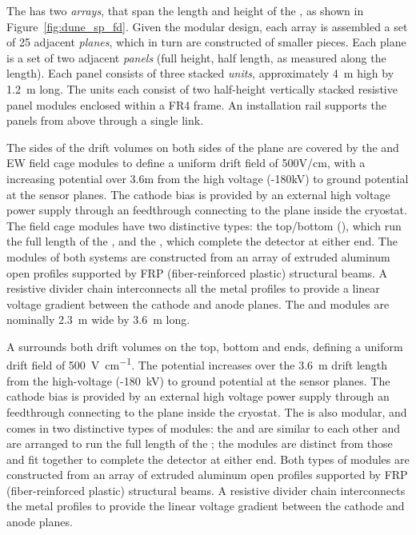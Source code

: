 The  has two  \textit{arrays}, that span the length and height of the , as shown in Figure~\ref{fig:dune_sp_fd}. Given the modular design, each array is assembled a set of 25 adjacent  \textit{planes}, which in turn are constructed of smaller pieces.  Each plane is a set of two adjacent \textit{panels} (full height, half length, as measured along the  length). Each panel consists of three stacked \textit{units}, approximately \SI{4}{\meter} high by \SI{1.2}{\meter} long. The units each consist of two half-height vertically stacked resistive panel modules enclosed within a FR4 frame.
An  installation rail supports the panels from above through a single link.


The sides of the drift volumes on both sides of the  plane are covered by the  and EW field cage modules to define a uniform drift field of 500V/cm, with a increasing potential over 3.6m from the high voltage  (-180kV) to ground potential at the  sensor planes. The cathode bias is provided by an external high voltage power supply through an  feedthrough connecting to the  plane inside the cryostat.
The field cage modules have two distinctive types: the top/bottom (), which run the full length of the , and the , %
which complete the detector at either end. The modules of both systems are constructed from an array of extruded aluminum open profiles supported by FRP (fiber-reinforced plastic) structural beams. A resistive divider chain interconnects all the metal profiles to provide a linear voltage gradient between the cathode and anode planes.  The  and  modules are nominally  \SI{2.3}{\meter} wide by  \SI{3.6}{\meter} long. 

A  surrounds both drift volumes on the top, bottom and ends, defining 
a uniform drift field of \SI{500}{\volt\per\centi\meter}. The potential increases over the \SI{3.6}{\meter} drift length from the high-voltage  (-\SI{180}{\kilo\volt}) to ground potential at the  sensor planes. The cathode bias is provided by an external high voltage power supply through an  feedthrough connecting to the  plane inside the cryostat. 
The  is also modular, and comes in two distinctive types of modules: the  and  are similar to each other and are arranged to run the full length of the ; the  modules are distinct from those and fit together to
complete the detector at either end. Both types of  modules are constructed from an array of extruded aluminum open profiles supported by FRP (fiber-reinforced plastic) structural beams. A resistive divider chain interconnects  the metal profiles to provide the linear voltage gradient between the cathode and anode planes.  

